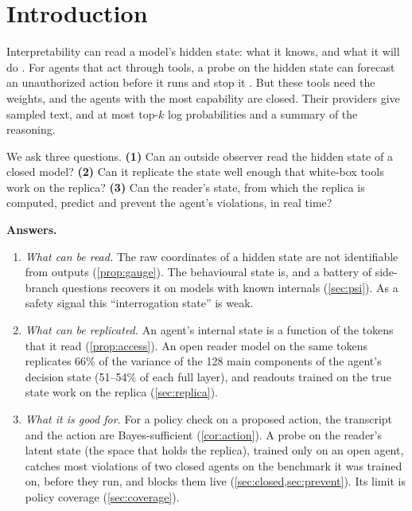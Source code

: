 \documentclass{article}
\begin{document}
\section{Introduction}
\label{sec:intro}



Interpretability can read a model's hidden state: what it knows, and what it will do \citep{burns2023ccs,marks2023geometry,zou2023repe,arditi2024refusal,goldowskydill2025probes}.
For agents that act through tools, a probe on the hidden state can forecast an unauthorized action before it runs and stop it \citep{fayyazi2026cape}.
But these tools need the weights, and the agents with the most capability are closed.
Their providers give sampled text, and at most top-$k$ log probabilities and a summary of the reasoning.

We ask three questions.
\textbf{(1)} Can an outside observer read the hidden state of a closed model?
\textbf{(2)} Can it replicate the state well enough that white-box tools work on the replica?
\textbf{(3)} Can the reader's state, from which the replica is computed, predict and prevent the agent's violations, in real time?

\textbf{Answers.}
\begin{enumerate}
\item \emph{What can be read.} The raw coordinates of a hidden state are not identifiable from outputs (\cref{prop:gauge}). The behavioural state is, and a battery of side-branch questions recovers it on models with known internals (\cref{sec:psi}). As a safety signal this ``interrogation state'' is weak.
\item \emph{What can be replicated.} An agent's internal state is a function of the tokens that it read (\cref{prop:access}). An open reader model on the same tokens replicates 66\% of the variance of the 128 main components of the agent's decision state (51--54\% of each full layer), and readouts trained on the true state work on the replica (\cref{sec:replica}).
\item \emph{What it is good for.} For a policy check on a proposed action, the transcript and the action are Bayes-sufficient (\cref{cor:action}). A probe on the reader's latent state (the space that holds the replica), trained only on an open agent, catches most violations of two closed agents on the benchmark it was trained on, before they run, and blocks them live (\cref{sec:closed,sec:prevent}). Its limit is policy coverage (\cref{sec:coverage}).
\end{enumerate}
\end{document}
